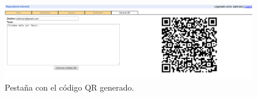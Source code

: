 \begin{figure}[h]
  \centering
    \includegraphics[scale=0.4]{./GoogleAppEngine/imagenes/codigoQR.png}
  \caption{Pestaña con el código QR generado.}
  \label{fig:codigoQR}
\end{figure}

